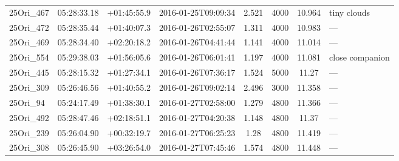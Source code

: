 \documentclass[12pt]{article}
\begin{document}
\begin{table}[ht!]
\begin{center}
\begin{threeparttable}
\begin{tabular}{lccccccl}
	25Ori\_467    & 05:28:33.18 & +01:45:55.9 & 2016-01-25T09:09:34  & 2.521         & 4000             & 10.964 & tiny clouds              \\
	25Ori\_472    & 05:28:35.44 & +01:40:07.3 & 2016-01-26T02:55:07  & 1.311         & 4000             & 10.983 & ---                      \\
	25Ori\_469    & 05:28:34.40 & +02:20:18.2 & 2016-01-26T04:41:44  & 1.141         & 4000             & 11.014 & ---                      \\
	25Ori\_554    & 05:29:38.03 & +01:56:05.6 & 2016-01-26T06:01:41  & 1.197         & 4000             & 11.081 & close companion          \\
	25Ori\_445    & 05:28:15.32 & +01:27:34.1 & 2016-01-26T07:36:17  & 1.524         & 5000             & 11.27  & ---                      \\
	25Ori\_309    & 05:26:46.56 & +01:40:55.2 & 2016-01-26T09:02:14  & 2.496         & 3000             & 11.358 & ---                      \\
	25Ori\_94     & 05:24:17.49 & +01:38:30.1 & 2016-01-27T02:58:00  & 1.279         & 4800             & 11.366 & ---                      \\
	25Ori\_492    & 05:28:47.46 & +02:18:51.1 & 2016-01-27T04:20:38  & 1.148         & 4800             & 11.37  & ---                      \\
	25Ori\_239    & 05:26:04.90 & +00:32:19.7 & 2016-01-27T06:25:23  & 1.28          & 4800             & 11.419 & ---                      \\
	25Ori\_308    & 05:26:45.90 & +03:26:54.0 & 2016-01-27T07:45:46  & 1.574         & 4800             & 11.448 & ---                      \\
	\bottomrule
	\end{tabular}
 \end{threeparttable}
\end{center}
\end{table}
\end{document}
